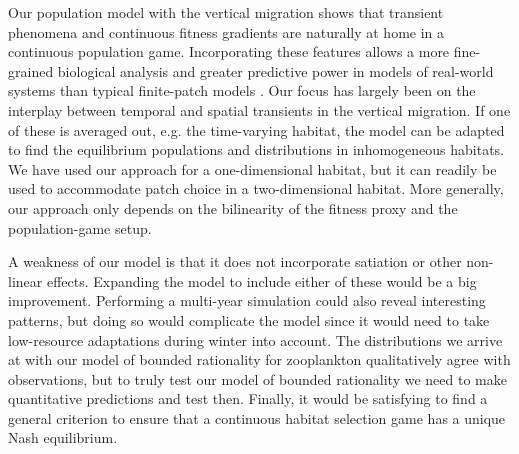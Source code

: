 




Our population model with the vertical migration shows that transient phenomena and continuous fitness gradients \citep{kawecki2004conceptual} are naturally at home in a continuous population game. Incorporating these features allows a more fine-grained biological analysis and greater predictive power in models of real-world systems than typical finite-patch models \citep{kvrivan2008ideal, sadowski2019predator}. Our focus has largely been on the interplay between temporal and spatial transients in the vertical migration. If one of these is averaged out, e.g. the time-varying habitat, the model can be adapted to find the equilibrium populations and distributions in inhomogeneous habitats. We have used our approach for a one-dimensional habitat, but it can readily be used to accommodate patch choice in a two-dimensional habitat. More generally, our approach only depends on the bilinearity of the fitness proxy and the population-game setup.



A weakness of our model is that it does not incorporate satiation or other non-linear effects. Expanding the model to include either of these would be a big improvement. Performing a multi-year simulation could also reveal interesting patterns, but doing so would complicate the model since it would need to take low-resource adaptations during winter into account. The distributions we arrive at with our model of bounded rationality for zooplankton qualitatively agree with observations, but to truly test our model of bounded rationality we need to make quantitative predictions and test then. Finally, it would be satisfying to find a general criterion to ensure that a continuous habitat selection game has a unique Nash equilibrium.


